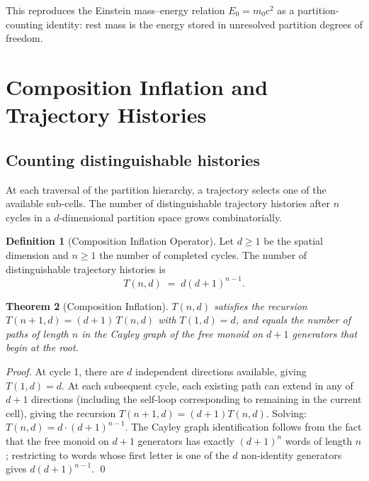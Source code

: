 \documentclass[11pt,twocolumn,a4paper]{article}
\theoremstyle{plain}
\newtheorem{theorem}{Theorem}[section]
\theoremstyle{definition}
\newtheorem{definition}[theorem]{Definition}
\theoremstyle{remark}
\begin{document}
This reproduces the Einstein mass--energy relation $E_0=m_0c^2$ as a partition-counting identity: rest mass is the energy stored in unresolved partition degrees of freedom.

\section{Composition Inflation and Trajectory Histories}
\label{sec:composition}

\subsection{Counting distinguishable histories}

At each traversal of the partition hierarchy, a trajectory selects one of the available sub-cells. The number of distinguishable trajectory histories after $n$ cycles in a $d$-dimensional partition space grows combinatorially.

\begin{definition}[Composition Inflation Operator]
\label{def:composition-inflation}
Let $d\geq 1$ be the spatial dimension and $n\geq 1$ the number of completed cycles. The number of distinguishable trajectory histories is
\begin{equation}
\label{eq:composition-inflation}
  T(n,d) \;=\; d(d+1)^{n-1}.
\end{equation}
\end{definition}

\begin{theorem}[Composition Inflation]
\label{thm:composition-inflation}
$T(n,d)$ satisfies the recursion $T(n+1,d)=(d+1)\,T(n,d)$ with $T(1,d)=d$, and equals the number of paths of length $n$ in the Cayley graph of the free monoid on $d+1$ generators that begin at the root.
\end{theorem}

\begin{proof}
At cycle 1, there are $d$ independent directions available, giving $T(1,d)=d$. At each subsequent cycle, each existing path can extend in any of $d+1$ directions (including the self-loop corresponding to remaining in the current cell), giving the recursion $T(n+1,d)=(d+1)T(n,d)$. Solving: $T(n,d)=d\cdot(d+1)^{n-1}$. The Cayley graph identification follows from the fact that the free monoid on $d+1$ generators has exactly $(d+1)^n$ words of length $n$; restricting to words whose first letter is one of the $d$ non-identity generators gives $d(d+1)^{n-1}$. \qed
\end{proof}
\end{document}
